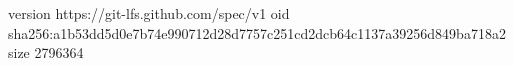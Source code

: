 version https://git-lfs.github.com/spec/v1
oid sha256:a1b53dd5d0e7b74e990712d28d7757c251cd2dcb64c1137a39256d849ba718a2
size 2796364
